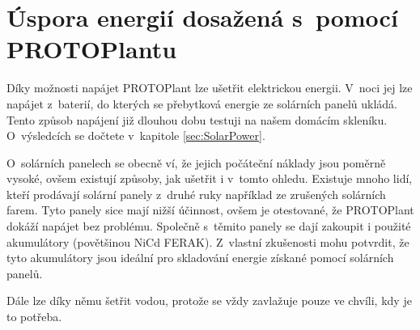 \chapter{Úspora energií dosažená s~pomocí PROTOPlantu}
Díky možnosti napájet PROTOPlant  lze ušetřit elektrickou energii. 
V~noci jej lze napájet z~baterií, do kterých se přebytková energie ze solárních panelů ukládá.
Tento způsob napájení již dlouhou dobu testuji na našem domácím skleníku. 
O~výsledcích se dočtete v~kapitole \ref{sec:SolarPower}.

O~solárních panelech se obecně ví, že jejich počáteční náklady jsou poměrně vysoké, ovšem existují způsoby, jak ušetřit i v~tomto ohledu.
Existuje mnoho lidí, kteří prodávají solární panely z~druhé ruky například ze zrušených solárních farem.
Tyto panely sice mají nižší účinnost, ovšem je otestované, že PROTOPlant dokáží napájet bez problému.
Společně s~těmito panely se dají zakoupit i použité akumulátory (povětšinou NiCd FERAK).
Z~vlastní zkušenosti mohu potvrdit, že tyto akumulátory jsou ideální pro skladování energie získané pomocí solárních panelů.

Dále lze díky němu šetřit vodou, protože se vždy zavlažuje pouze ve chvíli, kdy je to potřeba.

\newpage